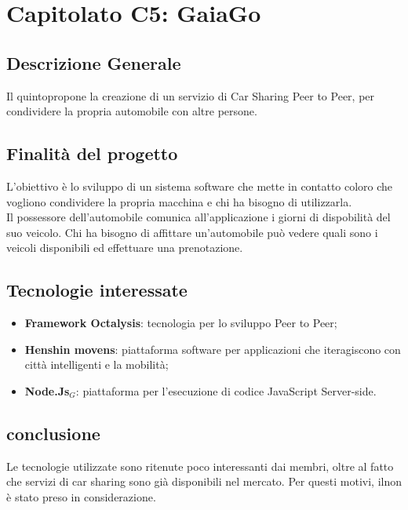 \chapter{Capitolato C5: GaiaGo}
\section{Descrizione Generale}

Il quintopropone la creazione di un servizio di Car Sharing Peer to Peer, per condividere la propria automobile con altre persone.


\section{Finalit\`a del progetto}
L'obiettivo è lo sviluppo di un sistema software che mette in contatto coloro che vogliono condividere la propria macchina e chi ha bisogno di utilizzarla.\\
Il possessore dell'automobile comunica all'applicazione i giorni di dispobilit\`a del suo veicolo.
Chi ha bisogno di affittare un'automobile può vedere quali sono i veicoli disponibili ed effettuare una prenotazione.

\section{Tecnologie interessate}
\begin{itemize}
\item \textbf{Framework Octalysis}: tecnologia per lo sviluppo Peer to Peer;
\item \textbf{Henshin movens}: piattaforma software per applicazioni che iteragiscono con città intelligenti e la mobilità;
\item \textbf{Node.Js$_{G}$}: piattaforma per l'esecuzione di codice JavaScript Server-side.
\end{itemize}
\section{conclusione}
Le tecnologie utilizzate sono ritenute poco interessanti dai membri, oltre al fatto che servizi di car sharing sono già disponibili nel mercato. Per questi motivi, ilnon è stato preso in considerazione. 
